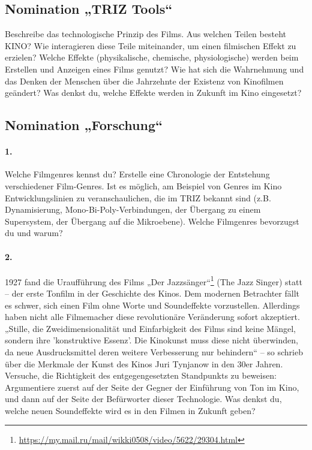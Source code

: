 \documentclass[11pt,a4paper]{article}
\begin{document}
\subsection*{Nomination „TRIZ Tools“}

Beschreibe das technologische Prinzip des Films. Aus welchen Teilen besteht
KINO?  Wie interagieren diese Teile miteinander, um einen filmischen Effekt zu
erzielen?  Welche Effekte (physikalische, chemische, physiologische) werden
beim Erstellen und Anzeigen eines Films genutzt? Wie hat sich die Wahrnehmung
und das Denken der Menschen über die Jahrzehnte der Existenz von Kinofilmen
geändert?  Was denkst du, welche Effekte werden in Zukunft im Kino eingesetzt?

\subsection*{Nomination „Forschung“}

\paragraph{1.}
Welche Filmgenres kennst du? Erstelle eine Chronologie der Entstehung
verschiedener Film-Genres. Ist es möglich, am Beispiel von Genres im Kino
Entwicklungslinien zu veranschaulichen, die im TRIZ bekannt sind
(z.B. Dynamisierung, Mono-Bi-Poly-Verbindungen, der Übergang zu einem
Supersystem, der Übergang auf die Mikroebene). Welche Filmgenres bevorzugst du
und warum?

\paragraph{2.}
1927 fand die Uraufführung des Films „Der
Jazzsänger“\footnote{\url{https://my.mail.ru/mail/wikki0508/video/5622/29304.html}}
(The Jazz Singer) statt -- der erste Tonfilm in der Geschichte des Kinos. Dem
modernen Betrachter fällt es schwer, sich einen Film ohne Worte und
Soundeffekte vorzustellen. Allerdings haben nicht alle Filmemacher diese
revolutionäre Veränderung sofort akzeptiert. „Stille, die Zweidimensionalität
und Einfarbigkeit des Films sind keine Mängel, sondern ihre 'konstruktive
Essenz'.  Die Kinokunst muss diese nicht überwinden, da neue Ausdrucksmittel
deren weitere Verbesserung nur behindern“ -- so schrieb über die Merkmale der
Kunst des Kinos Juri Tynjanow in den 30er Jahren. Versuche, die Richtigkeit
des entgegengesetzten Standpunkts zu beweisen: Argumentiere zuerst auf der
Seite der Gegner der Einführung von Ton im Kino, und dann auf der Seite der
Befürworter dieser Technologie. Was denkst du, welche neuen Soundeffekte wird
es in den Filmen in Zukunft geben?
\end{document}
